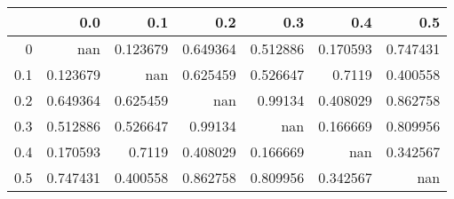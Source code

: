 \begin{tabular}{rrrrrrr}
\toprule
     &        0.0 &        0.1 &        0.2 &        0.3 &        0.4 &        0.5 \\
\midrule
 0   & nan        &   0.123679 &   0.649364 &   0.512886 &   0.170593 &   0.747431 \\
 0.1 &   0.123679 & nan        &   0.625459 &   0.526647 &   0.7119   &   0.400558 \\
 0.2 &   0.649364 &   0.625459 & nan        &   0.99134  &   0.408029 &   0.862758 \\
 0.3 &   0.512886 &   0.526647 &   0.99134  & nan        &   0.166669 &   0.809956 \\
 0.4 &   0.170593 &   0.7119   &   0.408029 &   0.166669 & nan        &   0.342567 \\
 0.5 &   0.747431 &   0.400558 &   0.862758 &   0.809956 &   0.342567 & nan        \\
\bottomrule
\end{tabular}